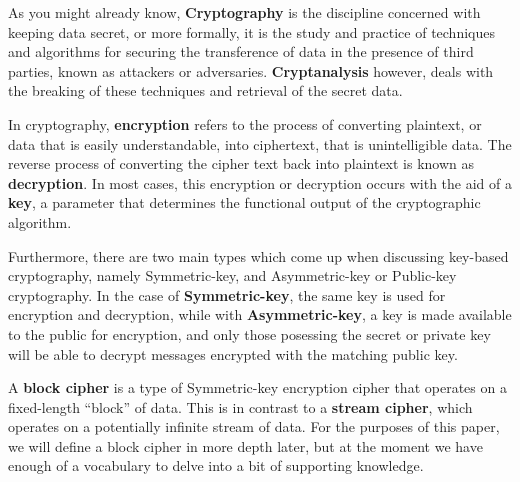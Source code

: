 As you might already know, \textbf{Cryptography} is the discipline concerned
with keeping data secret, or more formally, it is the study and practice
of techniques and algorithms for securing the transference of data
in the presence of third parties, known as attackers or adversaries.
\textbf{Cryptanalysis} however, deals with the breaking of these techniques 
and retrieval of the secret data. 

In cryptography, \textbf{encryption} refers to the process of converting plaintext,
or data that is easily understandable, into ciphertext, that is unintelligible
data. The reverse process of converting the cipher text back into plaintext is known
as \textbf{decryption}. In most cases, this encryption or decryption occurs with 
the aid of a \textbf{key}, a parameter that determines the functional output of 
the cryptographic algorithm.

Furthermore, there are two main types which come up when discussing key-based 
cryptography, namely Symmetric-key, and Asymmetric-key or Public-key cryptography. 
In the case of \textbf{Symmetric-key}, the same key is used for encryption and 
decryption, while with \textbf{Asymmetric-key}, a key is made available 
to the public for encryption, and only those posessing the secret or private 
key will be able to decrypt messages encrypted with the matching public key.

A \textbf{block cipher} is a type of Symmetric-key encryption cipher that operates
on a fixed-length ``block'' of data. This is in contrast to a \textbf{stream cipher},
which operates on a potentially infinite stream of data. For the purposes of this
paper, we will define a block cipher in more depth later, but at the moment we 
have enough of a vocabulary to delve into a bit of supporting knowledge.

\begin{comment}
To introduce this paper, I will give a short discussion of why we
need encryption, speak about block ciphers and differential attacks
there-on. Furthermore, I will outline what will be discussed in this
paper, namely background information on Probability Theory, Block 
Ciphers and Vectorial Boolean Functions (S-boxes), Differential
Properties of S-boxes and how Probability Theory relates. This
will build up to Differential Attacks, which will discuss the
various stages of an attack, and culminate in a Toy Example in which
a simple Block Cipher is broken. Finally there will be a conclusion
in which I summarize the paper.
\end{comment}

